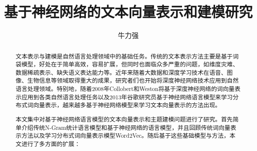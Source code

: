 \documentclass[master]{njuthesis}
\title{基于神经网络的文本向量表示和建模研究 }
\author{牛力强}
\institute{南京大学}
\begin{document}

\maketitle
\makeenglishtitle


\frontmatter

\begin{abstract}

文本表示与建模是自然语言处理领域中的基础任务。传统的文本表示方法主要是基于词袋模型，好处在于简单高效，容易扩展，但同时也面临众多严重的问题，如维度灾难、数据稀疏表示、缺失语义表达能力等。近年来随着大数据和深度学习技术在语音、图像、生物信息等领域取得重大的成果，研究者们也开始将深度神经网络技术应用到自然语言处理领域。特别地，随着2008年Collobert和Weston将基于深度神经网络的词向量表示应用到各类自然语言处理任务以及2013年谷歌研究员基于神经网络语言模型来学习分布式词向量表示，越来越多基于神经网络模型来学习文本向量表示的方法出现。

本文集中对基于神经网络语言模型的文本向量表示和主题建模问题进行了研究。首先简单介绍传统N-Gram统计语言模型和基于神经网络的语言模型，并且回顾传统词向量表示方法以及学习分布式词向量表示模型Word2Vec。随后基于这些基础模型与方法，本文进行了多方面的扩展：


\end{abstract}
\end{document}
